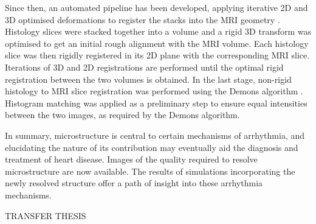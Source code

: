     Since then, an automated pipeline has been developed, applying iterative 2D and 3D optimised deformations to register the stacks into the MRI geometry \cite{Mansoori:2007p221}. Histology slices were stacked together into a volume and a rigid 3D transform was optimised to get an initial rough alignment with the MRI volume. Each histology slice was then rigidly registered in its 2D plane with the corresponding MRI slice. Iterations of 3D and 2D registrations are performed until the optimal rigid registration between the two volumes is obtained. In the last stage, non-rigid histology to MRI slice registration was performed using the Demons algorithm \cite{Thirion:1995p985}. Histogram matching was applied as a preliminary step to ensure equal intensities between the two images, as required by the Demons algorithm.
  

In summary, microstructure is central to certain mechanisms of arrhythmia, and elucidating the nature of its contribution may eventually aid the diagnosis and treatment of heart disease. Images of the quality required to resolve microstructure are now available. The results of simulations incorporating the newly resolved structure offer a path of insight into these arrhythmia mechanisms.

TRANSFER THESIS